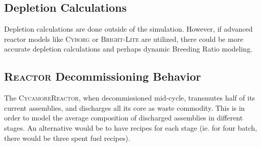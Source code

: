 \documentclass{article}
\newcommand{\Cycamore}{\textsc{Cycamore}\xspace}%
\begin{document}
\subsection{Depletion Calculations}
Depletion calculations are done outside of the simulation. However, if advanced reactor models like \textsc{Cyborg}\xspace
or \textsc{Bright-Lite}\xspace are utilized, there could be more accurate depletion calculations and 
perhaps dynamic Breeding Ratio modeling.

\subsection{\textsc{Reactor}\xspace Decommissioning Behavior}
The \Cycamore \textsc{Reactor}\xspace, when decommissioned mid-cycle, transmutes half of
its current assemblies, and discharges all its core as waste commodity. This is in order to model the average
composition of discharged assemblies in different stages. An alternative would
be to have recipes for each stage (ie. for four batch, there would be three spent fuel recipes).




\end{document}
